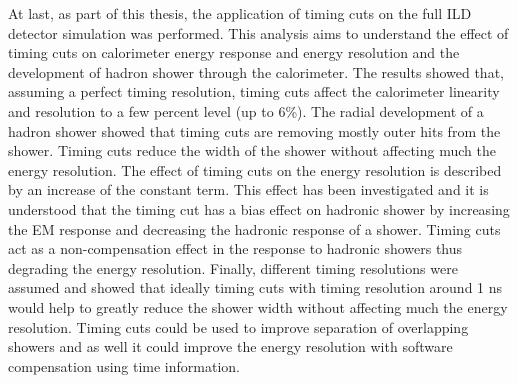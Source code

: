 At last, as part of this thesis, the application of timing cuts on the full ILD detector simulation was performed. This analysis aims to understand the effect of timing cuts on calorimeter energy response and energy resolution and the development of hadron shower through the calorimeter. The results showed that, assuming a perfect timing resolution, timing cuts affect the calorimeter linearity and resolution to a few percent level (up to 6\%). The radial development of a hadron shower showed that timing cuts are removing mostly outer hits from the shower. Timing cuts reduce the width of the shower without affecting much the energy resolution. The effect of timing cuts on the energy resolution is described by an increase of the constant term. This effect has been investigated and it is understood that the timing cut has a bias effect on hadronic shower by increasing the EM response and decreasing the hadronic response of a shower. Timing cuts act as a non-compensation effect in the response to hadronic showers thus degrading the energy resolution. Finally, different timing resolutions were assumed and showed that ideally timing cuts with timing resolution around 1 ns would help to greatly reduce the shower width without affecting much the energy resolution. Timing cuts could be used to improve separation of overlapping showers and as well it could improve the energy resolution with software compensation using time information.
